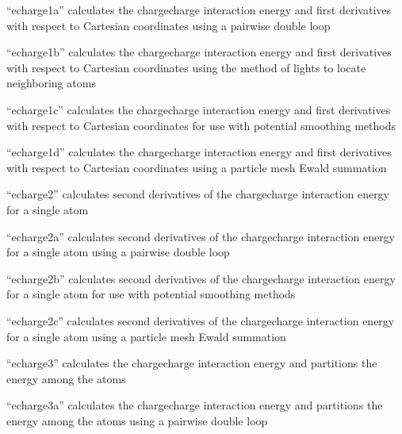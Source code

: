 \documentclass[letterpaper,11pt,english]{sphinxmanual}
\begin{document}

“echarge1a” calculates the charge\sphinxhyphen{}charge interaction energy and first derivatives with respect to Cartesian coordinates using a pairwise double loop


“echarge1b” calculates the charge\sphinxhyphen{}charge interaction energy and first derivatives with respect to Cartesian coordinates using the method of lights to locate neighboring atoms


“echarge1c” calculates the charge\sphinxhyphen{}charge interaction energy and first derivatives with respect to Cartesian coordinates for use with potential smoothing methods


“echarge1d” calculates the charge\sphinxhyphen{}charge interaction energy and first derivatives with respect to Cartesian coordinates using a particle mesh Ewald summation


“echarge2” calculates second derivatives of the charge\sphinxhyphen{}charge interaction energy for a single atom


“echarge2a” calculates second derivatives of the charge\sphinxhyphen{}charge interaction energy for a single atom using a pairwise double loop


“echarge2b” calculates second derivatives of the charge\sphinxhyphen{}charge interaction energy for a single atom for use with potential smoothing methods


“echarge2c” calculates second derivatives of the charge\sphinxhyphen{}charge interaction energy for a single atom using a particle mesh Ewald summation


“echarge3” calculates the charge\sphinxhyphen{}charge interaction energy and partitions the energy among the atoms


“echarge3a” calculates the charge\sphinxhyphen{}charge interaction energy and partitions the energy among the atoms using a pairwise double loop
\end{document}
